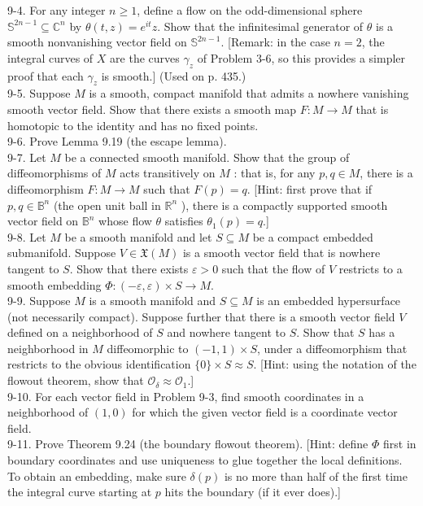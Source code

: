 \documentclass[10pt]{article}
\begin{document}
9-4. For any integer $n \geq 1$, define a flow on the odd-dimensional sphere $\mathbb{S}^{2 n-1} \subseteq \mathbb{C}^{n}$ by $\theta(t, z)=e^{i t} z$. Show that the infinitesimal generator of $\theta$ is a smooth nonvanishing vector field on $\mathbb{S}^{2 n-1}$. [Remark: in the case $n=2$, the integral curves of $X$ are the curves $\gamma_{z}$ of Problem 3-6, so this provides a simpler proof that each $\gamma_{z}$ is smooth.] (Used on p. 435.)\\
9-5. Suppose $M$ is a smooth, compact manifold that admits a nowhere vanishing smooth vector field. Show that there exists a smooth map $F: M \rightarrow M$ that is homotopic to the identity and has no fixed points.\\
9-6. Prove Lemma 9.19 (the escape lemma).\\
9-7. Let $M$ be a connected smooth manifold. Show that the group of diffeomorphisms of $M$ acts transitively on $M$ : that is, for any $p, q \in M$, there is a diffeomorphism $F: M \rightarrow M$ such that $F(p)=q$. [Hint: first prove that if $p, q \in \mathbb{B}^{n}$ (the open unit ball in $\mathbb{R}^{n}$ ), there is a compactly supported smooth vector field on $\mathbb{B}^{n}$ whose flow $\theta$ satisfies $\theta_{1}(p)=q$.]\\
9-8. Let $M$ be a smooth manifold and let $S \subseteq M$ be a compact embedded submanifold. Suppose $V \in \mathfrak{X}(M)$ is a smooth vector field that is nowhere tangent to $S$. Show that there exists $\varepsilon>0$ such that the flow of $V$ restricts to a smooth embedding $\Phi:(-\varepsilon, \varepsilon) \times S \rightarrow M$.\\
9-9. Suppose $M$ is a smooth manifold and $S \subseteq M$ is an embedded hypersurface (not necessarily compact). Suppose further that there is a smooth vector field $V$ defined on a neighborhood of $S$ and nowhere tangent to $S$. Show that $S$ has a neighborhood in $M$ diffeomorphic to $(-1,1) \times S$, under a diffeomorphism that restricts to the obvious identification $\{0\} \times S \approx S$. [Hint: using the notation of the flowout theorem, show that $\mathcal{O}_{\delta} \approx \mathcal{O}_{1}$.]\\
9-10. For each vector field in Problem 9-3, find smooth coordinates in a neighborhood of $(1,0)$ for which the given vector field is a coordinate vector field.\\
9-11. Prove Theorem 9.24 (the boundary flowout theorem). [Hint: define $\Phi$ first in boundary coordinates and use uniqueness to glue together the local definitions. To obtain an embedding, make sure $\delta(p)$ is no more than half of the first time the integral curve starting at $p$ hits the boundary (if it ever does).]\\
\end{document}
